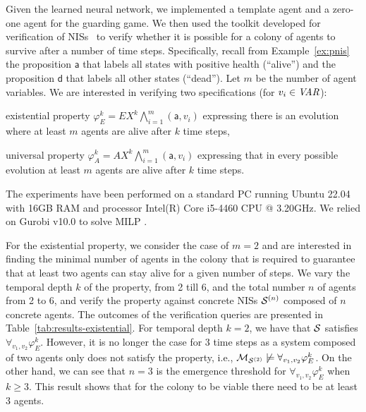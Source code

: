 Given the learned neural network, we implemented a template agent and a
zero-one agent for the guarding game. We then used the \venmas toolkit
developed for verification of NISs~\cite{Akintunde+20b} to verify whether it is
possible for a colony of agents to survive after a number of time steps.
%
Specifically, recall from Example~\ref{ex:pnis} the proposition $\mathsf{a}$
that labels all states with positive health (``alive'') and the proposition
$\mathsf{d}$ that labels all other states (``dead'').
%
Let $m$ be the number of agent variables. We are interested in verifying two
specifications (for $v_i \in\it{VAR}$):
\begin{inparaenum}[\it (i)]
\item existential property
  $\varphi^k_E = EX^k \bigwedge_{i=1}^m(\mathsf{a},v_i)$ 
  expressing there is an evolution where at least $m$ agents are alive after
  $k$ time steps,
\item universal property $\varphi^k_A = AX^k \bigwedge_{i=1}^m(\mathsf{a},v_i)$
  expressing that in every possible evolution at least $m$ agents are alive
  after $k$ time steps.
\end{inparaenum}
%
The experiments have been performed on a standard PC running Ubuntu 22.04 with
16GB RAM and processor Intel(R) Core i5-4460 CPU @ 3.20GHz. We relied on Gurobi
v10.0 to solve MILP \cite{Gurobi+16a}.

For the existential property, we consider the case of $m=2$ and are interested
in finding the minimal number of agents in the colony that is required to
guarantee that at least two agents can stay alive for a given number of
steps. We vary the temporal depth $k$ of the property, from 2 till 6, and the
total number $n$ of agents from 2 to 6, and verify the property against
concrete NISs $\mathcal{S}^{(n)}$ composed of $n$ concrete agents.  The outcomes of the
verification queries are presented in Table~\ref{tab:results-existential}.
%
For temporal depth $k=2$, we have that $\mathcal S$ satisfies
$\forall_{v_1,v_2}\varphi^k_E$. However, it is no longer the case for 3 time
steps as a system composed of two agents only does not satisfy the property,
i.e., $\mathcal{M}_{\mathcal{S}^{(2)}}\not\models\forall_{v_1,v_2}\varphi^k_E$. On the other hand, we
can see that $n=3$ is the emergence threshold for
$\forall_{v_1,v_2}\varphi^k_E$ when $k\geq 3$. This result shows that for the
colony to be viable there need to be at least 3 agents.

